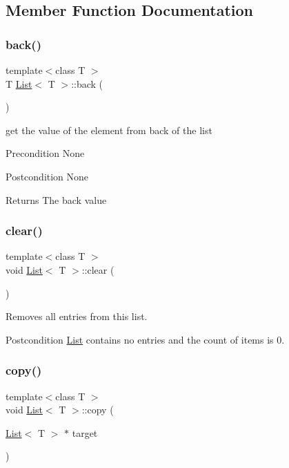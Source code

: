 \subsection{Member Function Documentation}
\mbox{\label{class_list_adcdd54cf42f6a98990618901e1fafa59}} 
\subsubsection{\texorpdfstring{back()}{back()}}
{\footnotesize\ttfamily template$<$class T $>$ \\
T \hyperlink{class_list}{List}$<$ T $>$\+::back (\begin{DoxyParamCaption}{ }\end{DoxyParamCaption})}

get the value of the element from back of the list \begin{DoxyPrecond}{Precondition}
None 
\end{DoxyPrecond}
\begin{DoxyPostcond}{Postcondition}
None 
\end{DoxyPostcond}
\begin{DoxyReturn}{Returns}
The back value 
\end{DoxyReturn}
\mbox{\label{class_list_ae296516a252e11963dbf963727ce429a}} 
\subsubsection{\texorpdfstring{clear()}{clear()}}
{\footnotesize\ttfamily template$<$class T $>$ \\
void \hyperlink{class_list}{List}$<$ T $>$\+::clear (\begin{DoxyParamCaption}{ }\end{DoxyParamCaption})}

Removes all entries from this list. \begin{DoxyPostcond}{Postcondition}
\hyperlink{class_list}{List} contains no entries and the count of items is 0. 
\end{DoxyPostcond}
\mbox{\label{class_list_ac6c3b0e253ce3c9b90053b95769f12a9}} 
\subsubsection{\texorpdfstring{copy()}{copy()}}
{\footnotesize\ttfamily template$<$class T $>$ \\
void \hyperlink{class_list}{List}$<$ T $>$\+::copy (\begin{DoxyParamCaption}\item[{\hyperlink{class_list}{List}$<$ T $>$ $\ast$}]{target }\end{DoxyParamCaption})}

